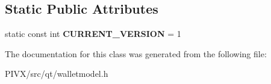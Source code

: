 \subsection*{Static Public Attributes}
\begin{DoxyCompactItemize}
\item 
\mbox{\label{class_send_coins_recipient_a275b0eea2c3140d69fb282d217a790f5}} 
static const int {\bfseries C\+U\+R\+R\+E\+N\+T\+\_\+\+V\+E\+R\+S\+I\+ON} = 1
\end{DoxyCompactItemize}


The documentation for this class was generated from the following file\+:\begin{DoxyCompactItemize}
\item 
P\+I\+V\+X/src/qt/walletmodel.\+h\end{DoxyCompactItemize}
